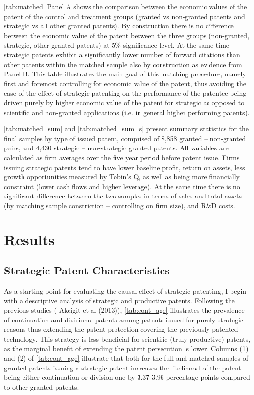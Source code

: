 \documentclass[11pt]{article}
\begin{document}
\autoref{tab:matched} Panel A shows the comparison between the economic values of the patent of the control and treatment groups (granted vs non-granted patents and strategic vs all other granted patents). By construction there is no difference between the economic value of the patent between the three groups (non-granted, strategic, other granted patents) at 5\% significance level. At the same time strategic patents exhibit a significantly lower number of forward citations than other patents within the matched sample also by construction as evidence from Panel B. This table illustrates the main goal of this matching procedure, namely first and foremost controlling for economic value of the patent, thus avoiding the case of the effect of strategic patenting on the performance of the patentee being driven purely by higher economic value of the patent for strategic as opposed to scientific and non-granted applications (i.e. in general higher performing patents). 

\autoref{tab:matched_sum} and \autoref{tab:matched_sum_s} present summary statistics for the final samples by type of issued patent, comprised of 8,858 granted -- non-granted pairs, and 4,430 strategic -- non-strategic granted patents. All variables are calculated as firm averages over the five year period before patent issue. Firms issuing strategic patents tend to have lower baseline profit, return on assets, less growth opportunities measured by Tobin's Q, as well as being more financially constraint (lower cash flows and higher leverage). At the same time there is no significant difference between the two samples in terms of sales and total assets (by matching sample constriction -- controlling on firm size), and R\&D costs. 

\section{Results}
\subsection{Strategic Patent Characteristics}

As a starting point for evaluating the causal effect of strategic patenting, I begin with a descriptive analysis of strategic and productive patents. Following the previous studies (\color{blue} Akcigit et al (2013)\color{black}), \autoref{tab:cont_age} illustrates the prevalence of continuation and divisional patents among patents issued for purely strategic reasons thus extending the patent protection covering the previously patented technology. This strategy is less beneficial for scientific (truly productive) patents, as the marginal benefit of extending the patent persecution is lower. Columns (1) and (2) of \autoref{tab:cont_age} illustrate that both for the full and matched samples of granted patents issuing a strategic patent increases the likelihood of the patent being either continuation or division one by 3.37-3.96 percentage points compared to other granted patents. 
\end{document}
